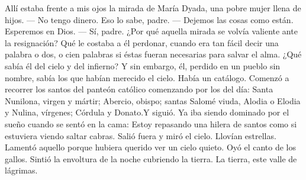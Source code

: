 \pend
\pstart
  \guillemotright Allí estaba frente a mis ojos la mirada de María Dyada, una pobre mujer llena de hijos.
\pend
%
\pstart
  \guillemotright --- No tengo dinero. Eso lo sabe, padre.
\pend
%
\pstart
  \guillemotright --- Dejemos las cosas como están. Esperemos en Dios.
\pend
%
\pstart
  \guillemotright --- Sí, padre.\guillemotright
\pend
%
\pstart
  ¿Por qué aquella mirada se volvía valiente ante la resignación? Qué le costaba a él perdonar, cuando era tan fácil decir una palabra o dos, o cien palabras si éstas fueran necesarias para salvar el alma. ¿Qué sabía él del cielo y del infierno? Y sin embargo, él, perdido en un pueblo sin nombre, sabía los que habían merecido el cielo. Había un catálogo. Comenzó a recorrer los santos del panteón católico comenzando por los del día: \guillemotleft Santa Nunilona, virgen y mártir; Abercio, obispo; santas Salomé viuda, Alodia o Elodia y Nulina, vírgenes; Córdula y Donato.\guillemotright Y siguió. Ya iba siendo dominado por el sueño cuando se sentó en la cama: \guillemotleft Estoy repasando una hilera de santos como si estuviera viendo saltar cabras.\guillemotright
\pend
%
\pstart
  Salió fuera y miró el cielo. Llovían estrellas. Lamentó aquello porque
  hubiera querido ver un cielo quieto. Oyó el canto de los gallos. Sintió la
  envoltura de la noche cubriendo la tierra. La tierra, \guillemotleft este valle de lágrimas\guillemotright.
\pend

